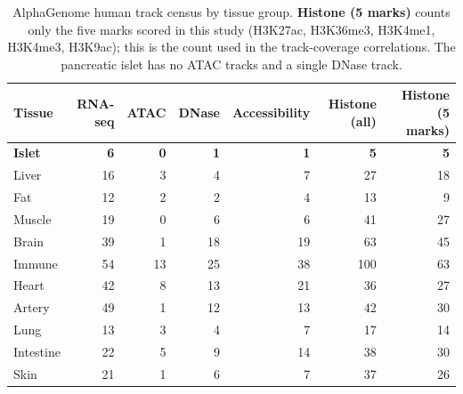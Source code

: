 \begin{table}[htbp]\centering\small
\caption{AlphaGenome human track census by tissue group. \textbf{Histone (5 marks)} counts only the five marks scored in this study (H3K27ac, H3K36me3, H3K4me1, H3K4me3, H3K9ac); this is the count used in the track-coverage correlations. The pancreatic islet has no ATAC tracks and a single DNase track.}\label{tab:tracks}
\begin{tabular}{lrrrrrr}\toprule
Tissue & RNA-seq & ATAC & DNase & Accessibility & Histone (all) & Histone (5 marks) \\ \midrule
\textbf{Islet} & \textbf{6} & \textbf{0} & \textbf{1} & \textbf{1} & \textbf{5} & \textbf{5} \\
Liver & 16 & 3 & 4 & 7 & 27 & 18 \\
Fat & 12 & 2 & 2 & 4 & 13 & 9 \\
Muscle & 19 & 0 & 6 & 6 & 41 & 27 \\
Brain & 39 & 1 & 18 & 19 & 63 & 45 \\
Immune & 54 & 13 & 25 & 38 & 100 & 63 \\
Heart & 42 & 8 & 13 & 21 & 36 & 27 \\
Artery & 49 & 1 & 12 & 13 & 42 & 30 \\
Lung & 13 & 3 & 4 & 7 & 17 & 14 \\
Intestine & 22 & 5 & 9 & 14 & 38 & 30 \\
Skin & 21 & 1 & 6 & 7 & 37 & 26 \\
\bottomrule\end{tabular}\end{table}